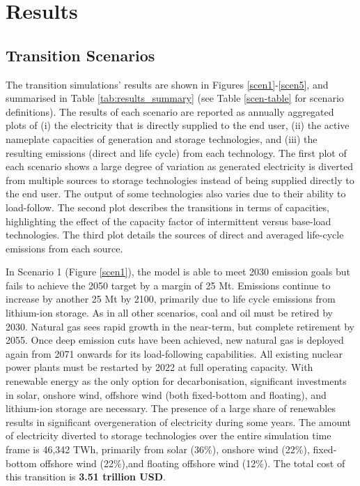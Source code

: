 \section{Results} \label{Results-and-discussion}

\subsection{Transition Scenarios}

The transition simulations' results are shown in Figures \ref{scen1}-\ref{scen5}, and summarised in Table \ref{tab:results_summary} (see Table \ref{scen-table} for scenario definitions). The results of each scenario are reported as annually aggregated plots of (i) the electricity that is directly supplied to the end user, (ii) the active nameplate capacities of generation and storage technologies, and (iii) the resulting emissions (direct and life cycle) from each technology. The first plot of each scenario shows a large degree of variation as generated electricity is diverted from multiple sources to storage technologies instead of being supplied directly to the end user. The output of some technologies also varies due to their ability to load-follow. The second plot describes the transitions in terms of capacities, highlighting the effect of the capacity factor of intermittent versus base-load technologies. The third plot details the sources of direct and averaged life-cycle emissions from each source.

In Scenario 1 (Figure \ref{scen1}), the model is able to meet 2030 emission goals but fails to achieve the 2050 target by a margin of 25 Mt. Emissions continue to increase by another 25 Mt by 2100, primarily due to life cycle emissions from lithium-ion storage. As in all other scenarios, coal and oil must be retired by 2030. Natural gas sees rapid growth in the near-term, but complete retirement by 2055. Once deep emission cuts have been achieved, new natural gas is deployed again from 2071 onwards for its load-following capabilities. All existing nuclear power plants must be restarted by 2022 at full operating capacity. With renewable energy as the only option for decarbonisation, significant investments in solar, onshore wind, offshore wind (both fixed-bottom and floating), and lithium-ion storage are necessary. The presence of a large share of renewables results in significant overgeneration of electricity during some years. The amount of electricity diverted to storage technologies over the entire simulation time frame is 46,342 TWh, primarily from solar (36\%), onshore wind (22\%), fixed-bottom offshore wind (22\%),and floating offshore wind (12\%). The total cost of this transition is \textbf{3.51 trillion USD}.

